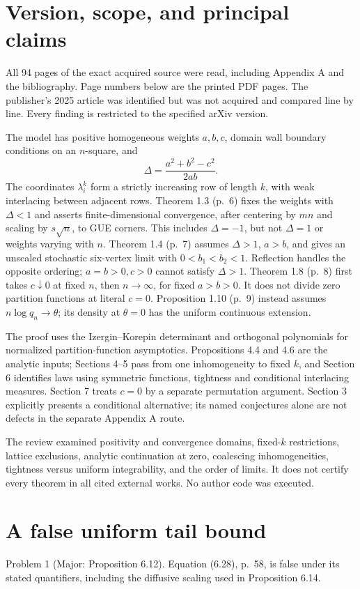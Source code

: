 \documentclass[10pt]{article}
\begin{document}
\section*{Version, scope, and principal claims}
All 94 pages of the exact acquired source were read, including Appendix A and the bibliography. Page numbers below are the printed PDF pages. The publisher’s 2025 article was identified but was not acquired and compared line by line. Every finding is restricted to the specified arXiv version.\par
The model has positive homogeneous weights \(a,b,c\), domain wall boundary conditions on an \(n\)-square, and \[\Delta=\frac{a^2+b^2-c^2}{2ab}.\] The coordinates \(\lambda_i^k\) form a strictly increasing row of length \(k\), with weak interlacing between adjacent rows. Theorem 1.3 (p. 6) fixes the weights with \(\Delta<1\) and asserts finite-dimensional convergence, after centering by \(mn\) and scaling by \(s\sqrt n\), to GUE corners. This includes \(\Delta=-1\), but not \(\Delta=1\) or weights varying with \(n\). Theorem 1.4 (p. 7) assumes \(\Delta>1\), \(a>b\), and gives an unscaled stochastic six-vertex limit with \(0<b_1<b_2<1\). Reflection handles the opposite ordering; \(a=b>0,c>0\) cannot satisfy \(\Delta>1\). Theorem 1.8 (p. 8) first takes \(c\downarrow0\) at fixed \(n\), then \(n\to\infty\), for fixed \(a>b>0\). It does not divide zero partition functions at literal \(c=0\). Proposition 1.10 (p. 9) instead assumes \(n\log q_n\to\theta\); its density at \(\theta=0\) has the uniform continuous extension.\par
The proof uses the Izergin–Korepin determinant and orthogonal polynomials for normalized partition-function asymptotics. Propositions 4.4 and 4.6 are the analytic inputs; Sections 4–5 pass from one inhomogeneity to fixed \(k\), and Section 6 identifies laws using symmetric functions, tightness and conditional interlacing measures. Section 7 treats \(c=0\) by a separate permutation argument. Section 3 explicitly presents a conditional alternative; its named conjectures alone are not defects in the separate Appendix A route.\par
The review examined positivity and convergence domains, fixed-\(k\) restrictions, lattice exclusions, analytic continuation at zero, coalescing inhomogeneities, tightness versus uniform integrability, and the order of limits. It does not certify every theorem in all cited external works. No author code was executed.\par
\section*{A false uniform tail bound}
Problem 1 (Major: Proposition 6.12).  Equation (6.28), p. 58, is false under its stated quantifiers, including the diffusive scaling used in Proposition 6.14.\par
\end{document}

